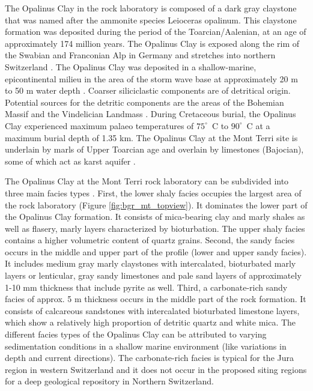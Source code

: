 The Opalinus Clay in the rock laboratory is composed of a dark gray claystone that was named after the ammonite species Leioceras opalinum. This claystone formation was deposited during the period of the Toarcian/Aalenian, at an age of approximately 174 million years. The Opalinus Clay is exposed along the rim of the Swabian and Franconian Alp in Germany and stretches into northern Switzerland \cite{einsele1983}. The Opalinus Clay was deposited in a shallow-marine, epicontinental milieu in the area of the storm wave base at approximately 20 m to 50 m water depth \cite{wetzel2003}. Coarser siliciclastic components are of detritical origin. Potential sources for the detritic components are the areas of the Bohemian Massif and the Vindelician Landmass \cite{wetzel2003}. During Cretaceous burial, the Opalinus Clay experienced maximum palaeo temperatures of $75^{\circ}$~C to $90^{\circ}$~C \cite{bossart2008} at a maximum burial depth of 1.35 km. The Opalinus Clay at the Mont Terri site is underlain by  marls of Upper Toarcian age and overlain by limestones (Bajocian), some of which act as karst aquifer \cite{pearson2003}.

The Opalinus Clay at the Mont Terri rock laboratory can be subdivided into three main facies types \cite{bossart2008}. First, the lower shaly facies occupies the largest area of the rock laboratory (Figure \ref{fig:bgr_mt_topview}). It dominates the lower part of the Opalinus Clay formation. It consists of mica-bearing clay and marly shales as well as flasery, marly layers characterized by bioturbation. The upper shaly facies contains a higher volumetric content of quartz grains. Second, the sandy facies occurs in the middle and upper part of the profile (lower and upper sandy facies). It includes medium gray marly claystones with intercalated, bioturbated marly layers or lenticular, gray sandy limestones and pale sand layers of approximately 1-10 mm thickness that include pyrite as well. Third, a carbonate-rich sandy facies of approx. 5 m thickness occurs in the middle part of the rock formation. It consists of calcareous sandstones with intercalated bioturbated limestone layers, which show a relatively high proportion of detritic quartz and white mica. The different facies types of the Opalinus Clay can be attributed to varying sedimentation conditions in a shallow marine environment (like variations in depth and current directions). The carbonate-rich facies is typical for the Jura region in western Switzerland and it does not occur in the proposed siting regions for a deep geological repository in Northern Switzerland.

